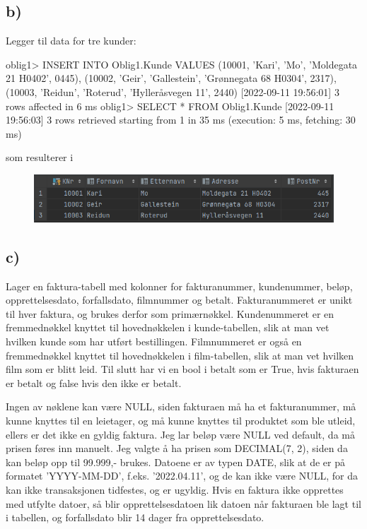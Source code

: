 \documentclass[%
notitlepage,
 amsmath,amssymb,
 aps,
rmp,
]{revtex4-2}  %
\begin{document}
\subsection*{b)}
Legger til data for tre kunder:
\begin{sql}
oblig1> INSERT INTO Oblig1.Kunde
        VALUES (10001, 'Kari', 'Mo', 'Moldegata 21 H0402', 0445),
               (10002, 'Geir', 'Gallestein', 'Grønnegata 68 H0304', 2317),
               (10003, 'Reidun', 'Roterud', 'Hylleråsvegen 11', 2440)
[2022-09-11 19:56:01] 3 rows affected in 6 ms
oblig1> SELECT *
        FROM Oblig1.Kunde
[2022-09-11 19:56:03] 3 rows retrieved starting from 1 in 35 ms (execution: 5 ms, fetching: 30 ms)
\end{sql}
som resulterer i
\begin{figure}[H]
\centering\includegraphics[width=\columnwidth]{op2b.png}
\end{figure}

\subsection*{c)}
Lager en faktura-tabell med kolonner for fakturanummer, kundenummer, beløp, opprettelsesdato, forfallsdato, filmnummer og betalt. Fakturanummeret er unikt til hver faktura, og brukes derfor som primærnøkkel. Kundenummeret er en fremmednøkkel knyttet til hovednøkkelen i kunde-tabellen, slik at man vet hvilken kunde som har utført bestillingen. Filmnummeret er også en fremmednøkkel knyttet til hovednøkkelen i film-tabellen, slik at man vet hvilken film som er blitt leid. Til slutt har vi en bool i betalt som er True, hvis fakturaen er betalt og false hvis den ikke er betalt.

Ingen av nøklene kan være NULL, siden fakturaen må ha et fakturanummer, må kunne knyttes til en leietager, og må kunne knyttes til produktet som ble utleid, ellers er det ikke en gyldig faktura. Jeg lar beløp være NULL ved default, da må prisen føres inn manuelt. Jeg valgte å ha prisen som DECIMAL(7, 2), siden da kan beløp opp til 99.999,- brukes. Datoene er av typen DATE, slik at de er på formatet 'YYYY-MM-DD', f.eks. '2022.04.11', og de kan ikke være NULL, for da kan ikke transaksjonen tidfestes, og er ugyldig. Hvis en faktura ikke opprettes med utfylte datoer, så blir opprettelsesdatoen lik datoen når fakturaen ble lagt til i tabellen, og forfallsdato blir 14 dager fra opprettelsesdato.
\end{document}
